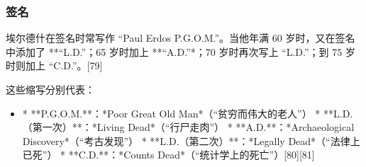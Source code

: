 \subsubsection{签名}
埃尔德什在签名时常写作 “Paul Erdos P.G.O.M.”。当他年满 60 岁时，又在签名中添加了 **“L.D.”；65 岁时加上 **“A.D.”*；70 岁时再次写上 “L.D.”；到 75 岁时则加上 “C.D.”。[79]

这些缩写分别代表：
\begin{itemize}
\item * **P.G.O.M.**：*Poor Great Old Man*（“贫穷而伟大的老人”）
* **L.D.（第一次）**：*Living Dead*（“行尸走肉”）
* **A.D.**：*Archaeological Discovery*（“考古发现”）
* **L.D.（第二次）**：*Legally Dead*（“法律上已死”）
* **C.D.**：*Counts Dead*（“统计学上的死亡”）[80][81]

\end{itemize}